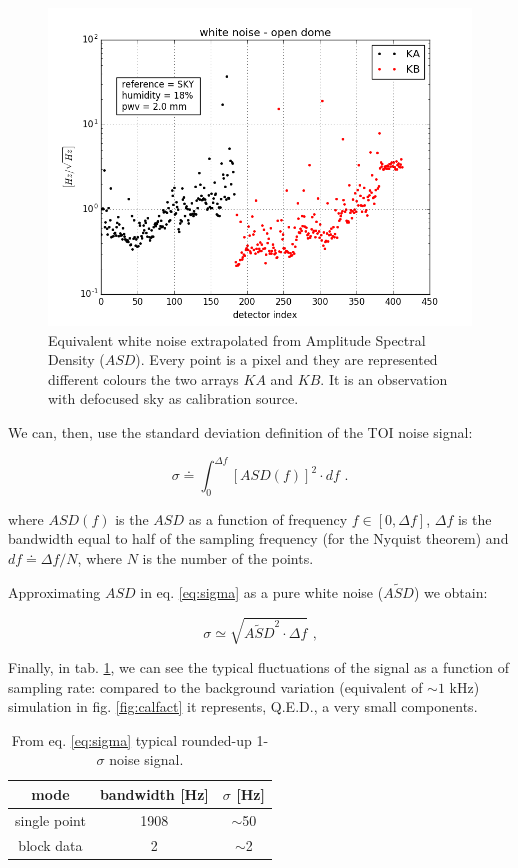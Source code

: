 \documentclass[twocolumn,traditabstract]{aa}\\
\begin{document}
\begin{figure}[htf]
	\centering
	\includegraphics[width=.5\textwidth]{4.results/white_noise_index.png}
	\caption{Equivalent white noise extrapolated from Amplitude Spectral Density ($ASD$). Every point is a pixel and they are represented different colours the two arrays $KA$ and $KB$. It is an observation with defocused sky as calibration source.}
	\label{fig:ASD}
\end{figure}

\noindent  We can, then, use the standard deviation definition of the TOI noise signal:

\begin{equation}
\sigma \doteq \int_{0}^{\Delta f} \left[ASD(f) \right]^2\cdot df \text{ .}
\label{eq:sigma}
\end{equation}

\noindent where $ASD(f)$ is the $ASD$ as a function of frequency $f\in[0,\Delta f]$, $\Delta f$ is the bandwidth equal to half of the sampling frequency (for the Nyquist theorem) and $df\doteq\Delta f/N$, where $N$ is the number of the points.

\noindent Approximating $ASD$ in eq. \ref{eq:sigma} as a pure white noise ($\tilde{ASD}$) we obtain:

\begin{equation}
\sigma\simeq \sqrt{ \tilde{ASD}^2 \cdot \Delta f } \text{ ,}
\end{equation}

\noindent Finally, in tab. \ref{tab:sigma_sig}, we can see the typical fluctuations of the signal as a function of sampling rate: compared to the background variation (equivalent of $\sim 1$ kHz) simulation in fig. \ref{fig:calfact} it represents, Q.E.D., a very small components.

\begin{table}[htf]
	\footnotesize
	\centering
	\caption{From eq. \ref{eq:sigma} typical rounded-up 1-$\sigma$ noise signal.}
	\begin{tabular}{ccc}
		\toprule
		\textbf{mode} & \textbf{bandwidth [Hz]} & \textbf{$\sigma$ [Hz]} \\
		\toprule
		single point & 1908 & $\sim$50 \\ 
		\midrule 
		block data & 2 & $\sim$2 \\ 
		\bottomrule
	\end{tabular}
	\label{tab:sigma_sig}
\end{table}
\end{document}
